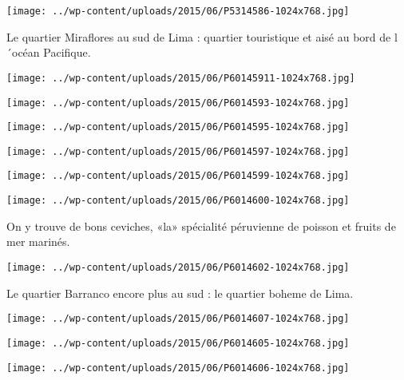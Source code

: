 \newline
\centerline{\texttt{[image: ../wp-content/uploads/2015/06/P5314586-1024x768.jpg]} } 
 \newline
 Le quartier Miraflores au sud de Lima : quartier touristique et aisé au bord de l´océan Pacifique. \newline
 \newline
\centerline{\texttt{[image: ../wp-content/uploads/2015/06/P60145911-1024x768.jpg]} } 
 \newline
 \newline
\centerline{\texttt{[image: ../wp-content/uploads/2015/06/P6014593-1024x768.jpg]} } 
 \newline
 \newline
\centerline{\texttt{[image: ../wp-content/uploads/2015/06/P6014595-1024x768.jpg]} } 
 \newline
 \newline
\centerline{\texttt{[image: ../wp-content/uploads/2015/06/P6014597-1024x768.jpg]} } 
 \newline
 \newline
\centerline{\texttt{[image: ../wp-content/uploads/2015/06/P6014599-1024x768.jpg]} } 
 \newline
 \newline
\centerline{\texttt{[image: ../wp-content/uploads/2015/06/P6014600-1024x768.jpg]} } 
 \newline
 On y trouve de bons ceviches, «la» spécialité péruvienne de poisson et fruits de mer marinés. \newline
 \newline
\centerline{\texttt{[image: ../wp-content/uploads/2015/06/P6014602-1024x768.jpg]} } 
 \newline
 Le quartier Barranco encore plus au sud : le quartier boheme de Lima. \newline
 \newline
\centerline{\texttt{[image: ../wp-content/uploads/2015/06/P6014607-1024x768.jpg]} } 
 \newline
 \newline
\centerline{\texttt{[image: ../wp-content/uploads/2015/06/P6014605-1024x768.jpg]} } 
 \newline
 \newline
\centerline{\texttt{[image: ../wp-content/uploads/2015/06/P6014606-1024x768.jpg]} } 
 \newline
